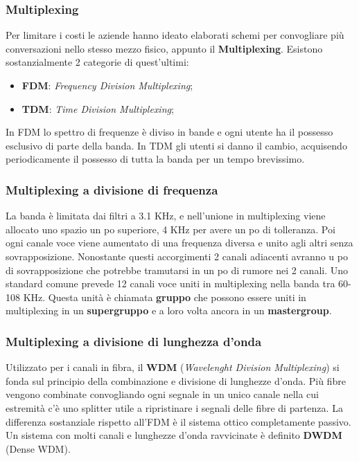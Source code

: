 \subsubsection{Multiplexing}

Per limitare i costi le aziende hanno ideato elaborati schemi per convogliare più conversazioni nello stesso mezzo fisico, appunto il\textbf{ Multiplexing}. Esistono sostanzialmente 2 categorie di quest'ultimi:

\begin{itemize}

\item{\textbf{FDM}: \textit{Frequency Division Multiplexing}};
\item{\textbf{TDM}: \textit{Time Division Multiplexing}};

\end{itemize}

In FDM lo spettro di frequenze è diviso in bande e ogni utente ha il possesso esclusivo di parte della banda. In TDM gli utenti si danno il cambio, acquisendo periodicamente il possesso di tutta la banda per un tempo brevissimo.

\subsubsection*{Multiplexing a divisione di frequenza}

La banda è limitata dai filtri a 3.1 KHz, e nell'unione in multiplexing viene allocato uno spazio un po superiore, 4 KHz per avere un po di tolleranza. Poi ogni canale voce viene aumentato di una frequenza diversa e unito agli altri senza sovrapposizione. Nonostante questi accorgimenti 2 canali adiacenti avranno u po di sovrapposizione che potrebbe tramutarsi in un po di rumore nei 2 canali. Uno standard comune prevede 12 canali voce uniti in multiplexing nella banda tra 60-108 KHz. Questa unità è chiamata \textbf{gruppo} che possono essere uniti in multiplexing in un \textbf{supergruppo} e a loro volta ancora in un \textbf{mastergroup}.

\subsubsection*{Multiplexing a divisione di lunghezza d'onda}

Utilizzato per i canali in fibra, il \textbf{WDM} (\textit{Wavelenght Division Multiplexing}) si fonda sul principio della combinazione e divisione di lunghezze d'onda. Più fibre vengono combinate convogliando ogni segnale in un unico canale nella cui estremità c'è uno splitter utile a ripristinare i segnali delle fibre di partenza. La differenza sostanziale rispetto all'FDM è il sistema ottico completamente passivo. Un sistema con molti canali e lunghezze d'onda ravvicinate è definito \textbf{DWDM} (Dense WDM).

